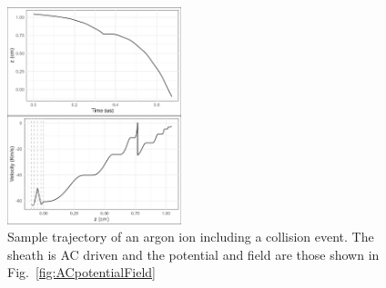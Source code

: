 \begin{figure}[htbp]
\centering
\includegraphics[width=0.45\textwidth]{Figures/ionTrajectory2Pa13.56MHz2kVStack2332.jpeg}
\caption{Sample trajectory of an argon ion including a collision event. The sheath is AC driven and the potential and field are those shown in Fig.~\ref{fig:ACpotentialField} }
\label{fig:CollisionACtrajectory}
\end{figure}
